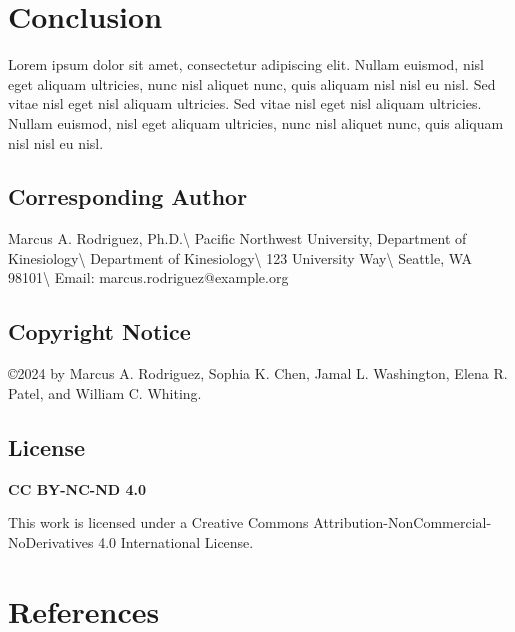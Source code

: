 \documentclass[
  jou,
  longtable,
  nolmodern,
  notxfonts,
  notimes,
  colorlinks=true,linkcolor=blue,citecolor=blue,urlcolor=blue,
  jou]{apa7}
\begin{document}
\section{Conclusion}\label{conclusion}

Lorem ipsum dolor sit amet, consectetur adipiscing elit. Nullam euismod,
nisl eget aliquam ultricies, nunc nisl aliquet nunc, quis aliquam nisl
nisl eu nisl. Sed vitae nisl eget nisl aliquam ultricies. Sed vitae nisl
eget nisl aliquam ultricies. Nullam euismod, nisl eget aliquam
ultricies, nunc nisl aliquet nunc, quis aliquam nisl nisl eu nisl.

\subsection{Corresponding Author}\label{corresponding-author}

Marcus A. Rodriguez, Ph.D.\textbackslash{} Pacific Northwest University,
Department of Kinesiology\textbackslash{} Department of
Kinesiology\textbackslash{} 123 University Way\textbackslash{} Seattle,
WA 98101\textbackslash{} Email: marcus.rodriguez@example.org

\subsection{Copyright Notice}\label{copyright-notice}

\copyright 2024 by Marcus A. Rodriguez, Sophia K. Chen, Jamal L.
Washington, Elena R. Patel, and William C. Whiting.

\subsection{License}\label{license}

\textbf{CC BY-NC-ND 4.0}

This work is licensed under a Creative Commons
Attribution-NonCommercial-NoDerivatives 4.0 International License.

\section{References}\label{references}
\end{document}
